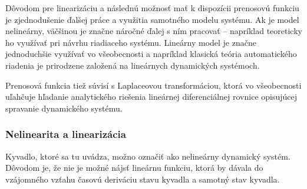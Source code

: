 \documentclass[a4paper, 10pt, ]{article}
\begin{document}
Dôvodom pre linearizáciu a následnú možnosť mať k dispozícii prenosovú funkciu je zjednodušenie ďalšej práce a využitia samotného modelu systému. Ak je model nelineárny, väčšinou je značne náročné ďalej s ním pracovať -- napríklad teoreticky ho využívať pri návrhu riadiaceho systému. Lineárny model je značne jednoduchšie využívať vo všeobecnosti a napríklad klasická teória automatického riadenia je prirodzene založená na lineárnych dynamických systémoch.

Prenosová funkcia tiež súvisí s Laplaceovou transformáciou, ktorá vo všeobecnosti uľahčuje hľadanie analytického riešenia lineárnej diferenciálnej rovnice opisujúcej spravanie dynamického systému.


\subsubsection{Nelinearita a linearizácia}

Kyvadlo, ktoré sa tu uvádza, možno označiť ako nelineárny dynamický systém. Dôvodom je, že nie je možné nájsť lineárnu funkciu, ktorá by dávala do vzájomného vzťahu časovú deriváciu stavu kyvadla a samotný stav kyvadla.
\end{document}
